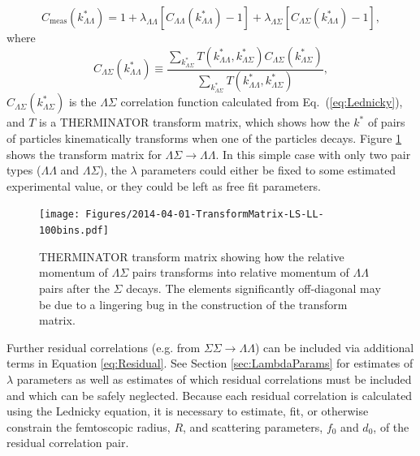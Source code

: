 \begin{equation}
\label{eq:Residual}
C_{\mathrm{meas}}(k^*_{\Lambda\Lambda})= 1 + \lambda_{\Lambda\Lambda}[C_{\Lambda\Lambda}(k^*_{\Lambda\Lambda})-1]+\lambda_{\Lambda\Sigma}[C_{\Lambda\Sigma}(k^*_{\Lambda\Lambda})-1],
\end{equation}
where 
\begin{equation}
\label{eq:ResCorSmear}
C_{\Lambda\Sigma}(k^*_{\Lambda\Lambda}) \equiv \frac{\displaystyle\sum\limits_{k^*_{\Lambda\Sigma}}T(k^*_{\Lambda\Lambda},k^*_{\Lambda\Sigma})C_{\Lambda\Sigma}(k^*_{\Lambda\Sigma})}{\displaystyle\sum\limits_{k^*_{\Lambda\Sigma}}T(k^*_{\Lambda\Lambda},k^*_{\Lambda\Sigma})},
\end{equation}
$C_{\Lambda\Sigma}(k^*_{\Lambda\Sigma})$ is the $\Lambda\Sigma$ correlation function calculated from Eq.~(\ref{eq:Lednicky}), and $T$ is a THERMINATOR \cite{Chojnacki:2011hb} transform matrix, which shows how the $k^*$ of pairs of particles kinematically transforms when one of the particles decays.  
Figure \ref{fig:TherminatorLS} shows the transform matrix for $\Lambda\Sigma \rightarrow \Lambda\Lambda$.  
In this simple case with only two pair types ($\Lambda\Lambda$ and $\Lambda\Sigma$), the $\lambda$ parameters could either be fixed to some estimated experimental value, or they could be left as free fit parameters.

\begin{figure}[hbtp]
\texttt{[image: Figures/2014-04-01-TransformMatrix-LS-LL-100bins.pdf]}
\caption[Transform matrix for $k^*_{\Lambda\Sigma} \rightarrow k^*_{\Lambda\Lambda}$]{THERMINATOR \cite{Chojnacki:2011hb} transform matrix showing how the relative momentum of $\Lambda\Sigma$ pairs transforms into relative momentum of $\Lambda\Lambda$ pairs after the $\Sigma$ decays.  
The elements significantly off-diagonal may be due to a lingering bug in the construction of the transform matrix.}
\label{fig:TherminatorLS}
\end{figure}

Further residual correlations (e.g. from $\Sigma\Sigma \rightarrow \Lambda\Lambda$) can be included via additional terms in Equation \ref{eq:Residual}.  
See Section \ref{sec:LambdaParams} for estimates of $\lambda$ parameters as well as estimates of which residual correlations must be included and which can be safely neglected.  
Because each residual correlation is calculated using the Lednicky equation, it is necessary to estimate, fit, or otherwise constrain the femtoscopic radius, $R$, and scattering parameters, $f_0$ and $d_0$, of the residual correlation pair.

